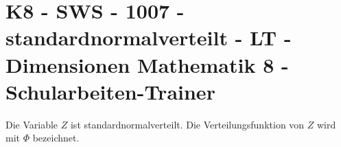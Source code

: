 \section{K8 - SWS - 1007 - standardnormalverteilt - LT - Dimensionen Mathematik 8 - Schularbeiten-Trainer}

\begin{beispiel}[K8 - SWS]{1}
Die Variable $Z$ ist standardnormalverteilt. Die Verteilungsfunktion von $Z$ wird mit $\Phi$ bezeichnet.

\end{beispiel}